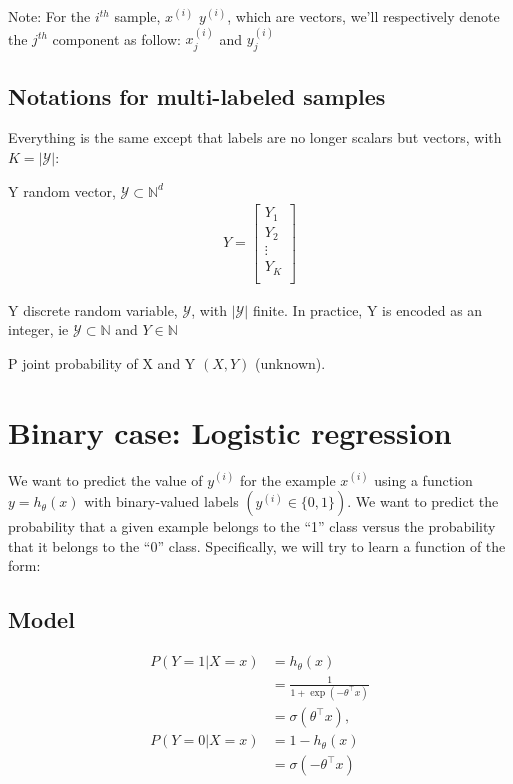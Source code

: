 Note:
For the $i^{th}$ sample, $x^{(i)}$ $y^{(i)}$, which are vectors, we'll respectively denote the $j^{th}$ component as follow: $x_j^{(i)}$ and $y_j^{(i)}$


\subsection*{Notations for multi-labeled samples}

Everything is the same except that labels are no longer scalars but vectors, with $K = |\mathcal{Y}|$:

\begin{outline}
\1 Y random vector, $\mathcal{Y} \subset \mathbb{N}^d$
\begin{align}
	Y = \left[
	\begin{array}{cccc}
		Y_{1} \\
		Y_{2} \\
		\vdots\\
		Y_{K} \\
	\end{array}\right]
\end{align}

\1 Y discrete random variable, $\mathcal{Y} $, with $|\mathcal{Y}|$ finite. In practice, Y is encoded as an integer, ie $\mathcal{Y} \subset \mathbb{N} $ and $Y \in \mathbb{N}$

\1 P joint probability of X and Y $(X,Y)$ (unknown).
\end{outline}






\section{Binary case: Logistic regression} %
\label{sec:workflow}


We want to predict the value of $y^{(i)}$ for the example $x^{(i)}$ using a function $y = h_\theta(x) $ with binary-valued labels $\left(y^{(i)} \in \{0,1\}\right)$. We want to predict the probability that a given example belongs to the “1” class versus the probability that it belongs to the “0” class. Specifically, we will try to learn a function of the form:

\subsection{Model}
\begin{align}
	P(Y=1|X=x) &= h_\theta(x) \\
			   &= \frac{1}{1 + \exp(-\theta^\top x)} \\
			   &= \sigma(\theta^\top x),\\
	P(Y=0|X=x) &= 1 - h_\theta(x) \\
			   &= \sigma(-\theta^\top x)
\end{align}


